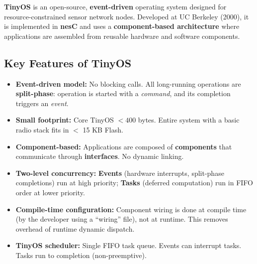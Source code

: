 \documentclass[12pt,a4paper]{article}
\begin{document}
\begin{tcolorbox}[defbox, title={\textbf{TinyOS --- Definition}}]
\textbf{TinyOS} is an open-source, \textbf{event-driven} operating system designed for resource-constrained sensor network nodes. Developed at UC Berkeley (2000), it is implemented in \textbf{nesC} and uses a \textbf{component-based architecture} where applications are assembled from reusable hardware and software components.
\end{tcolorbox}

\subsection{Key Features of TinyOS}

\begin{itemize}[leftmargin=*, itemsep=3pt]
  \item \textbf{Event-driven model:} No blocking calls. All long-running operations are \textbf{split-phase}: operation is started with a \textit{command}, and its completion triggers an \textit{event}.
  \item \textbf{Small footprint:} Core TinyOS $< 400$ bytes. Entire system with a basic radio stack fits in $<$ 15 KB Flash.
  \item \textbf{Component-based:} Applications are composed of \textbf{components} that communicate through \textbf{interfaces}. No dynamic linking.
  \item \textbf{Two-level concurrency:} \textbf{Events} (hardware interrupts, split-phase completions) run at high priority; \textbf{Tasks} (deferred computation) run in FIFO order at lower priority.
  \item \textbf{Compile-time configuration:} Component wiring is done at compile time (by the developer using a ``wiring'' file), not at runtime. This removes overhead of runtime dynamic dispatch.
  \item \textbf{TinyOS scheduler:} Single FIFO task queue. Events can interrupt tasks. Tasks run to completion (non-preemptive).
\end{itemize}
\end{document}

